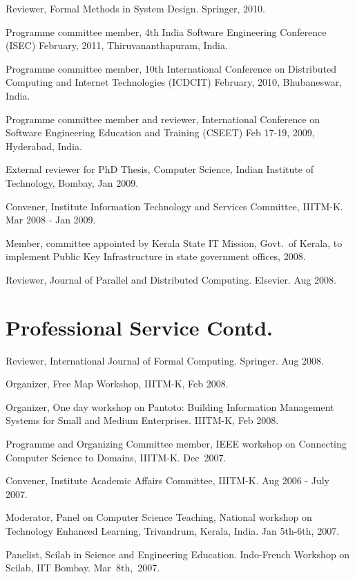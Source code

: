 \documentclass[11pt,margin,line]{res}
\begin{document}
\begin{resume}
Reviewer,  Formal Methods in System Design.  Springer, 2010.

Programme committee member, 4th India Software Engineering
Conference (ISEC) February, 2011, Thiruvananthapuram, India.

Programme committee member, 10th International Conference on
Distributed Computing and Internet Technologies (ICDCIT)
February, 2010, Bhubaneswar, India.

Programme committee member and reviewer, International
Conference on Software Engineering Education and Training
(CSEET) Feb 17-19, 2009, Hyderabad, India.


External reviewer for PhD Thesis, Computer Science, Indian
Institute of Technology, Bombay, Jan 2009.

Convener, Institute Information Technology and Services
Committee, IIITM-K.  Mar 2008 - Jan 2009.

Member, committee appointed by Kerala State IT Mission,
Govt.~of Kerala, to implement Public Key Infrastructure in
state government offices, 2008.


Reviewer, Journal of Parallel and Distributed Computing.
Elsevier. Aug 2008.

\newpage

\section{\sc Professional Service Contd.}

Reviewer, International Journal of Formal Computing.
Springer. Aug 2008.

Organizer, Free Map Workshop, IIITM-K, Feb 2008. 

Organizer, One day workshop on Pantoto: Building Information
Management Systems for Small and Medium Enterprises. 
IIITM-K, Feb 2008.


Programme and Organizing Committee member, IEEE workshop on
Connecting Computer Science to Domains, IIITM-K.  Dec~2007.

Convener, Institute Academic Affairs Committee, IIITM-K.
Aug 2006 - July 2007.


Moderator, Panel on Computer Science Teaching, National
workshop on Technology Enhanced Learning, Trivandrum,
Kerala, India.  Jan 5th-6th, 2007.

Panelist, Scilab in Science and Engineering Education.
Indo-French Workshop on Scilab, IIT Bombay.  Mar~8th,~2007.


\end{resume}
\end{document}
